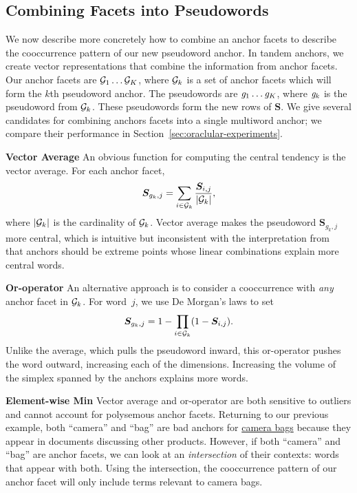 \subsection{Combining Facets into Pseudowords}
\label{sec:combine-facets}

We now describe more concretely how to combine an anchor facets to describe
the cooccurrence pattern of our new pseudoword anchor.
In tandem anchors, we create vector representations that combine
the information from anchor facets.
Our anchor facets are $\mathcal{G}_{1} \dots \mathcal{G}_{K}$, where $\mathcal{G}_{k}$ is a set of
anchor facets which will form the $k$th pseudoword anchor.
The pseudowords are $\mathit{g}_{1} \dots
\mathit{g}_{K}$, where $\mathit{g}_{k}$ is the pseudoword from $\mathcal{G}_{k}$.
These pseudowords form the new rows of $\bm{S}$.
We give several candidates for combining anchors facets into a single
multiword anchor;
we compare their performance in Section~\ref{sec:oraclular-experiments}.

\textbf{Vector Average}
An obvious function for computing the central tendency is the vector
average.
For each anchor facet,
\begin{equation}
\bm{S}_{g_k,j} = \sum_{i \in \mathcal{G}_{k}} \frac{\bm{S}_{i,j}}{|\mathcal{G}_{k}|},
\label{eq:vector-average}
\end{equation}
where $|\mathcal{G}_{k}|$ is the cardinality of $\mathcal{G}_{k}$.
Vector average makes the pseudoword $\bm{S}_{g_k,j}$ more central,
which is intuitive but inconsistent with the interpretation
from~ that anchors should
be extreme points whose linear combinations explain more central words.

\textbf{Or-operator}
An alternative approach is to consider a cooccurrence with \emph{any}
anchor facet in $\mathcal{G}_{k}$.
For word~$j$, we use De Morgan's laws to set
\begin{equation}
\bm{S}_{g_k,j} = 1 - \prod_{i \in \mathcal{G}_{k}} (1 - \bm{S}_{i, j}).
\label{eq:vector-or}
\end{equation}
Unlike the average, which pulls the pseudoword inward, this or-operator pushes
the word outward, increasing each of the dimensions.
Increasing the volume of the simplex spanned by the anchors explains
more words.

\textbf{Element-wise Min}
Vector average and or-operator are both sensitive to outliers and cannot
account for polysemous anchor facets.
Returning to our previous example, both ``camera'' and ``bag'' are bad anchors
for \underline{camera bags} because they appear in documents discussing
other products.
However, if both ``camera'' and ``bag'' are anchor facets, we can look at an
\emph{intersection} of their contexts: words that appear with both.
Using the intersection, the cooccurrence pattern of our anchor facet will only
include terms relevant to camera bags.

